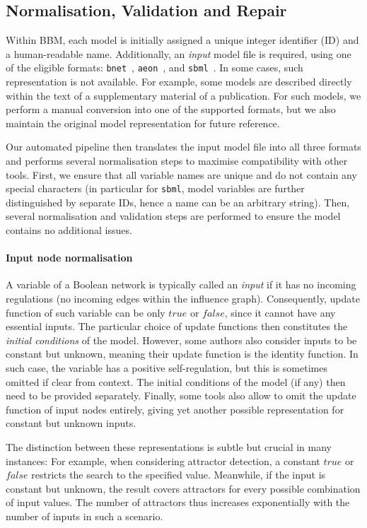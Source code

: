 \documentclass[fleqn,10pt]{wlscirep}
\begin{document}
\subsection*{Normalisation, Validation and Repair}

Within BBM, each model is initially assigned a unique integer identifier (ID) and a human-readable name. Additionally, an \emph{input} model file is required, using one of the eligible formats: \texttt{bnet}~\cite{pyboolnet}, \texttt{aeon}~\cite{aeon}, and \texttt{sbml}~\cite{sbml-qual}. In some cases, such representation is not available. For example, some models are described directly within the text of a supplementary material of a publication. For such models, we perform a manual conversion into one of the supported formats, but we also maintain the original model representation for future reference.

Our automated pipeline then translates the input model file into all three formats and performs several normalisation steps to maximise compatibility with other tools. First, we ensure that all variable names are unique and do not contain any special characters (in particular for \texttt{sbml}, model variables are further distinguished by separate IDs, hence a name can be an arbitrary string). Then, several normalisation and validation steps are performed to ensure the model contains no additional issues.

\paragraph*{Input node normalisation} A variable of a Boolean network is typically called an \emph{input} if it has no incoming regulations (no incoming edges within the influence graph). Consequently, update function of such variable can be only $\mathit{true}$ or $\mathit{false}$, since it cannot have any essential inputs. The particular choice of update functions then constitutes the \emph{initial conditions} of the model. However, some authors also consider inputs to be constant but unknown, meaning their update function is the identity function. In such case, the variable has a positive self-regulation, but this is sometimes omitted if clear from context. The initial conditions of the model (if any) then need to be provided separately. Finally, some tools also allow to omit the update function of input nodes entirely, giving yet another possible representation for constant but unknown inputs.

The distinction between these representations is subtle but crucial in many instances: For example, when considering attractor detection, a constant $\mathit{true}$ or $\mathit{false}$ restricts the search to the specified value. Meanwhile, if the input is constant but unknown, the result covers attractors for every possible combination of input values. The number of attractors thus increases exponentially with the number of inputs in such a scenario.
\end{document}
